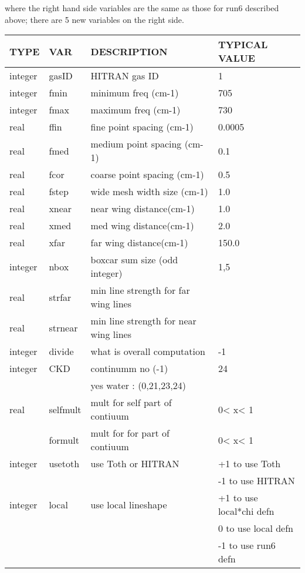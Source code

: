 \documentclass[11pt]{article}
\begin{document}
where the right hand side variables are the same as those for run6 
described above; there are 5 new variables on the right side.

\begin{longtable}{llll}
\hline
\hline
  TYPE  &   VAR  &         DESCRIPTION  &            TYPICAL VALUE\\
\hline
\hline
integer & gasID  &       HITRAN gas ID      &            1\\
\hline

integer & fmin    &      minimum freq (cm-1) &          705\\
integer & fmax    &      maximum freq (cm-1) &          730\\
\hline

real   &  ffin    &      fine point spacing (cm-1) &    0.0005\\
real   &  fmed    &      medium point spacing (cm-1)&   0.1\\
real   &  fcor    &      coarse point spacing (cm-1)  & 0.5\\
\hline

real   &  fstep   &      wide mesh width size (cm-1) &    1.0\\
real   &  xnear   &      near wing distance(cm-1)    &    1.0\\
real   &  xmed    &      med wing distance(cm-1)     &    2.0\\
real   &  xfar    &      far wing distance(cm-1)     &    150.0\\
\hline

integer & nbox     &     boxcar sum size (odd integer) &  1,5\\
\hline

real   &  strfar   &    min line strength for far wing lines & \\
real   &  strnear  &    min line strength for near wing lines& \\
\hline
integer &  divide  &      what is overall computation    &   -1 \\
integer &  CKD     &       continumm no (-1)            &   24 \\
        &          &       yes water : (0,21,23,24)     &      \\
\hline

real    &  selfmult &       mult for self part of contiuum & 0< x< 1 \\
        &  formult  &       mult for for  part of contiuum & 0< x< 1 \\
\hline

integer & usetoth &        use Toth or HITRAN &           +1 to use Toth \\
        &         &                           &          -1 to use HITRAN \\
\hline

integer & local &         use local lineshape   & +1 to use local*chi defn\\
        &       &                                  &  0 to use local defn \\
        &       &                                  & -1 to use run6 defn\\
\hline
\hline
\end{longtable}
\end{document}

